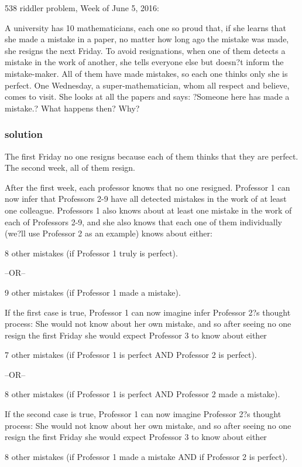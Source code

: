 \documentclass[a4paper,12pt]{article}
\begin{document}
538 riddler problem, Week of June 5, 2016:

A university has 10 mathematicians, each one so proud that, if she learns that she made a mistake in a paper, no matter how long ago the mistake was made, she resigns the next Friday. To avoid resignations, when one of them detects a mistake in the work of another, she tells everyone else but doesn?t inform the mistake-maker. All of them have made mistakes, so each one thinks only she is perfect. One Wednesday, a super-mathematician, whom all respect and believe, comes to visit. She looks at all the papers and says: ?Someone here has made a mistake.? What happens then? Why?

\subsubsection*{solution}

The first Friday no one resigns because each of them thinks that they are perfect. The second week, all of them resign. 

After the first week, each professor knows that no one resigned. Professor 1 can now infer that Professors 2-9 have all detected mistakes in the work of at least one colleague. Professors 1 also knows about at least one mistake in the work of each of Professors 2-9, and she also knows that each one of them individually (we?ll use Professor 2 as an example) knows about either: 

8 other mistakes (if Professor 1 truly is perfect).

--OR--

9 other mistakes (if Professor 1 made a mistake).


If the first case is true, Professor 1 can now imagine infer Professor 2?s thought process: She would not know about her own mistake, and so after seeing no one resign the first Friday she would expect Professor 3 to know about either

7 other mistakes (if Professor 1 is perfect AND Professor 2 is perfect).

--OR--

8 other mistakes (if Professor 1 is perfect AND Professor 2 made a mistake).

If the second case is true, Professor 1 can now imagine Professor 2?s thought process: She would not know about her own mistake, and so after seeing no one resign the first Friday she would expect Professor 3 to know about either

8 other mistakes (if Professor 1 made a mistake AND if Professor 2 is perfect).
\end{document}
